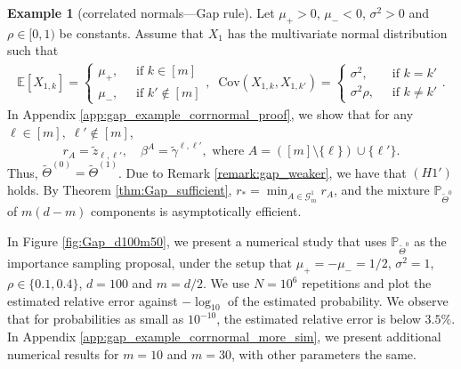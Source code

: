 \documentclass[aap,preprint]{imsart}
\newcommand{\Mstar}{[m]}
\newcommand{\Pro}{{\mathbb{P}}}
\newcommand{\Exp}{{\mathbb{E}}}
\theoremstyle{plain}
\theoremstyle{definition}
\newtheorem{example}{Example}
\begin{document}
\begin{example}[correlated normals---Gap rule]\label{example:corr_normal_Gap} Let $\mu_{+} > 0$, $\mu_{-} < 0$, $\sigma^2 > 0$ and $\rho \in [0,1)$ be constants.  Assume that $X_1$ has the multivariate normal distribution such that 
\begin{align*}
\Exp[X_{1,k}] = \begin{cases}
\mu_{+}, \; & \text{ if } k \in \Mstar\\
\mu_{-},\; & \text{ if } k' \not\in \Mstar
\end{cases}, \;\;
\text{Cov}(X_{1,k}, X_{1,k'}) = 
\begin{cases}
\sigma^2, \; & \text{ if } k = k' \\
\sigma^2 \rho,\; & \text{ if }  k \neq k'
\end{cases}.
\end{align*}
In Appendix \ref{app:gap_example_corrnormal_proof}, we show that for any $\ell \in \Mstar, \; \ell' \not \in \Mstar$,
$$r_{A} = \tilde{z}_{\ell,\ell'}, \quad
\beta^{A} = \tilde{\gamma}^{\ell,\ell'}, \text{ where }
A = (\Mstar \setminus \{\ell\}) \cup \{\ell'\}.
$$
Thus, $\widetilde{\Theta}^{(0)} = \widetilde{\Theta}^{(1)}$. 
Due to Remark \ref{remark:gap_weaker},
we have that $(H1')$ holds.  By Theorem \ref{thm:Gap_sufficient},
$r_* =  \min_{A \in \mathcal{G}_m^{1}} r_{A}$, and 
the mixture $\Pro_{\widetilde{\Theta}^{0}}$ of $m(d-m)$ components is asymptotically efficient.


In Figure \ref{fig:Gap_d100m50},  we present a numerical study that uses $\Pro_{\widetilde{\Theta}^{0}}$ as the importance sampling proposal, under the setup that $\mu_{+} = -\mu_{-} = 1/2$, $\sigma^2 = 1$, $\rho \in \{0.1,0.4\}$, $d = 100$ and $m = d/2$. We use $N = 10^6$ repetitions and plot the estimated relative error against $-\log_{10}$ of the estimated probability. We observe that for probabilities as small as $10^{-10}$, the estimated relative error is below $3.5\%$. In Appendix \ref{app:gap_example_corrnormal_more_sim}, we present additional numerical results for $m = 10$ and $m = 30$, with other parameters the same.


\end{example}
\end{document}
